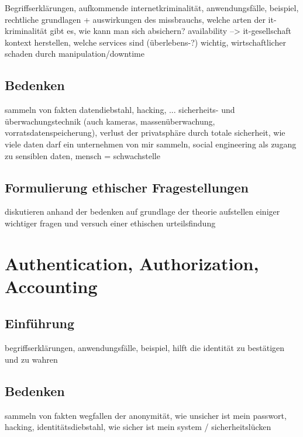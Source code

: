 \documentclass[letterpaper, 12pt]{article}
\let\tempsection\section
\renewcommand\section[1]{\vspace{-0.3cm}\tempsection{#1}\vspace{-0.3cm}}
\let\tempsubsection\subsection
\renewcommand\subsection[1]{\vspace{0cm}\tempsubsection{#1}\vspace{0cm}}
\begin{document}
Begriffserklärungen, aufkommende internetkriminalität, anwendungsfälle, beispiel, rechtliche grundlagen + auswirkungen des missbrauchs, welche arten der it-kriminalität gibt es, wie kann man sich absichern? \newline availability --> it-gesellschaft kontext herstellen, welche services sind (überlebens-?) wichtig, wirtschaftlicher schaden durch manipulation/downtime

\subsection{Bedenken}

sammeln von fakten \newline
datendiebstahl, hacking, ... sicherheits- und überwachungstechnik (auch kameras, massenüberwachung, vorratsdatenspeicherung), verlust der privatsphäre durch totale sicherheit, wie viele daten darf ein unternehmen von mir sammeln, social engineering als zugang zu sensiblen daten, mensch = schwachstelle

\subsection{Formulierung ethischer Fragestellungen}

diskutieren anhand der bedenken auf grundlage der theorie \newline
aufstellen einiger wichtiger fragen und versuch einer ethischen urteilsfindung

\clearpage

\section{Authentication, Authorization, Accounting}

\subsection{Einführung}

begriffserklärungen, anwendungsfälle, beispiel, hilft die identität zu bestätigen und zu wahren

\subsection{Bedenken}

sammeln von fakten \newline
wegfallen der anonymität, wie unsicher ist mein passwort, hacking, identitätsdiebstahl, wie sicher ist mein system / sicherheitslücken
\end{document}
